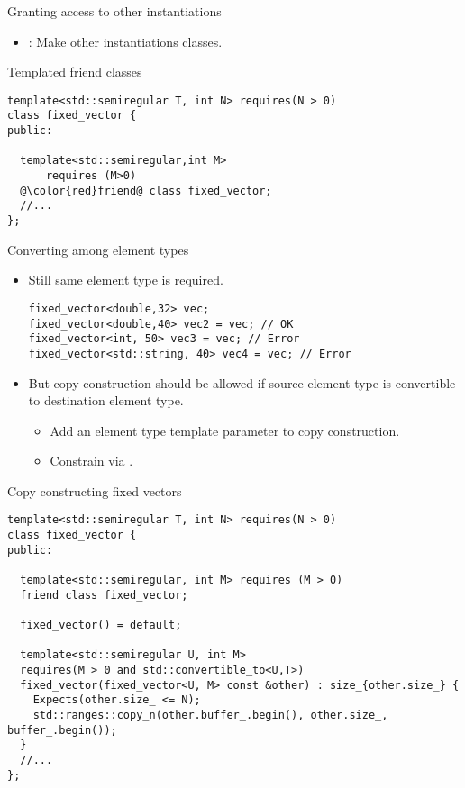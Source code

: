 \begin{frame}[t,fragile]{Granting access to other instantiations}
\begin{itemize}
  \item {}: Make other instantiations  classes.
\end{itemize}

\begin{block}{Templated friend classes}
\begin{lstlisting}[escapechar=@]
template<std::semiregular T, int N> requires(N > 0)
class fixed_vector {
public:

  template<std::semiregular,int M> 
      requires (M>0)
  @\color{red}friend@ class fixed_vector;
  //...
};
\end{lstlisting}
\end{block}
\end{frame}

\begin{frame}[t,fragile]{Converting among element types}
\begin{itemize}
  \item Still same element type is required.
\begin{lstlisting}
fixed_vector<double,32> vec;
fixed_vector<double,40> vec2 = vec; // OK
fixed_vector<int, 50> vec3 = vec; // Error
fixed_vector<std::string, 40> vec4 = vec; // Error
\end{lstlisting}

  \item But copy construction should be allowed if source element type is convertible
        to destination element type.
    \begin{itemize}
      \item Add an element type template parameter to copy construction.
      \item Constrain via .
    \end{itemize}
\end{itemize}
\end{frame}

\begin{frame}[t,fragile]
\begin{block}{Copy constructing fixed vectors}
\begin{lstlisting}
template<std::semiregular T, int N> requires(N > 0)
class fixed_vector {
public:

  template<std::semiregular, int M> requires (M > 0)
  friend class fixed_vector;

  fixed_vector() = default;

  template<std::semiregular U, int M>
  requires(M > 0 and std::convertible_to<U,T>)
  fixed_vector(fixed_vector<U, M> const &other) : size_{other.size_} {
    Expects(other.size_ <= N);
    std::ranges::copy_n(other.buffer_.begin(), other.size_, buffer_.begin());
  }
  //...
};
\end{lstlisting}
\end{block}
\end{frame}

